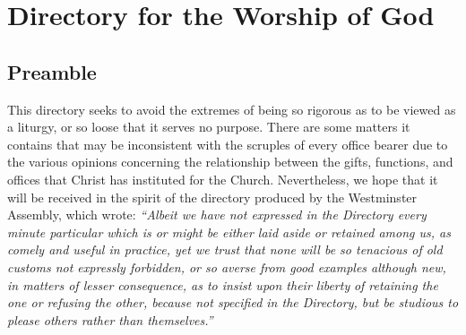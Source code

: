 \chapter{Directory for the Worship of God}

\section{Preamble}  This directory seeks to avoid the extremes of being so rigorous as to be viewed as a liturgy, or so loose that it serves no purpose. There are some matters it contains that may be inconsistent with the scruples of every office bearer due to the various opinions concerning the relationship between the gifts, functions, and offices that Christ has instituted for the Church. Nevertheless, we hope that it will be received in the spirit of the directory produced by the Westminster Assembly, which wrote:  \textit{{``Albeit we have not expressed in the Directory every minute particular which is or might be either laid aside or retained among us, as comely and useful in practice, yet we trust that none will be so tenacious of old customs not expressly forbidden, or so averse from good examples although new, in matters of lesser}}\textit{ consequence, as to insist upon their liberty}\textit{ of retaining the one or refusing the other, because not specified in the Directory, but be studious to please others rather than themselves.'' }

